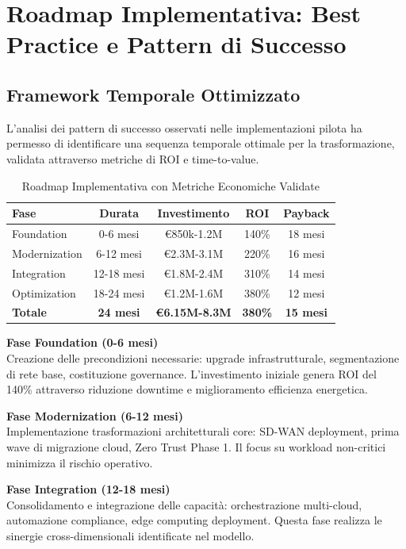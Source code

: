 \section{Roadmap Implementativa: Best Practice e Pattern di Successo}

\subsection{Framework Temporale Ottimizzato}

L'analisi dei pattern di successo osservati nelle implementazioni pilota ha permesso di identificare una sequenza temporale ottimale per la trasformazione, validata attraverso metriche di ROI e time-to-value.

\begin{table}[htbp]
\centering
\caption{Roadmap Implementativa con Metriche Economiche Validate}
\label{tab:roadmap_master}
\begin{tabular}{lcccc}
\toprule
\textbf{Fase} & \textbf{Durata} & \textbf{Investimento} & \textbf{ROI} & \textbf{Payback} \\
\midrule
Foundation & 0-6 mesi & €850k-1.2M & 140\% & 18 mesi \\
Modernization & 6-12 mesi & €2.3M-3.1M & 220\% & 16 mesi \\
Integration & 12-18 mesi & €1.8M-2.4M & 310\% & 14 mesi \\
Optimization & 18-24 mesi & €1.2M-1.6M & 380\% & 12 mesi \\
\midrule
\textbf{Totale} & \textbf{24 mesi} & \textbf{€6.15M-8.3M} & \textbf{380\%} & \textbf{15 mesi} \\
\bottomrule
\end{tabular}
\end{table}

\textbf{Fase Foundation (0-6 mesi)}\\
Creazione delle precondizioni necessarie: upgrade infrastrutturale, segmentazione di rete base, costituzione governance. L'investimento iniziale genera ROI del 140\% attraverso riduzione downtime e miglioramento efficienza energetica.

\textbf{Fase Modernization (6-12 mesi)}\\
Implementazione trasformazioni architetturali core: SD-WAN deployment, prima wave di migrazione cloud, Zero Trust Phase 1. Il focus su workload non-critici minimizza il rischio operativo.

\textbf{Fase Integration (12-18 mesi)}\\
Consolidamento e integrazione delle capacità: orchestrazione multi-cloud, automazione compliance, edge computing deployment. Questa fase realizza le sinergie cross-dimensionali identificate nel modello.


